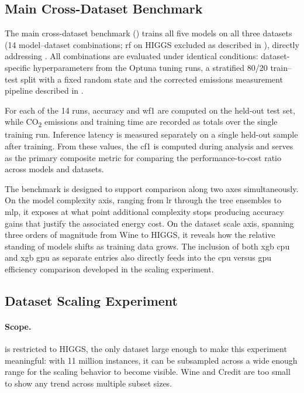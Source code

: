 \subsection{Main Cross-Dataset Benchmark}
\label{design_main_benchmark}\label{exp:1}

The main cross-dataset benchmark () trains all five models on all three datasets (14 model--dataset combinations; \gls{rf} on HIGGS excluded as described in ), directly addressing . All combinations are evaluated under identical conditions: dataset-specific hyperparameters from the Optuna tuning runs, a stratified 80/20 train--test split with a fixed random state and the corrected emissions measurement pipeline described in .

For each of the 14 runs, accuracy and \gls{wf1} are computed on the held-out test set, while CO\textsubscript{2} emissions and training time are recorded as totals over the single training run. Inference latency is measured separately on a single held-out sample after training. From these values, the \gls{cf1} is computed during analysis and serves as the primary composite metric for comparing the performance-to-cost ratio across models and datasets.

The benchmark is designed to support comparison along two axes simultaneously. On the model complexity axis, ranging from \gls{lr} through the tree ensembles to \gls{mlp}, it exposes at what point additional complexity stops producing accuracy gains that justify the associated energy cost. On the dataset scale axis, spanning three orders of magnitude from Wine to HIGGS, it reveals how the relative standing of models shifts as training data grows. The inclusion of both \gls{xgb} \gls{cpu} and \gls{xgb} \gls{gpu} as separate entries also directly feeds into the \gls{cpu} versus \gls{gpu} efficiency comparison developed in the scaling experiment.

\subsection{Dataset Scaling Experiment}
\label{design_scaling}\label{exp:2}

\paragraph{Scope.}
 is restricted to HIGGS, the only dataset large enough to make this experiment meaningful: with 11 million instances, it can be subsampled across a wide enough range for the scaling behavior to become visible. Wine and Credit are too small to show any trend across multiple subset sizes.

